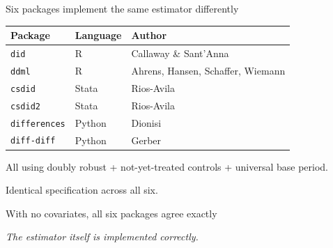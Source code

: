 \documentclass[aspectratio=169,11pt]{beamer}
\begin{document}
\begin{frame}{Six packages implement the same estimator differently}

\begin{center}
\small
\begin{tabular}{@{}lll@{}}
\toprule
Package & Language & Author \\
\midrule
\texttt{did} & R & Callaway \& Sant'Anna \\
\texttt{ddml} & R & Ahrens, Hansen, Schaffer, Wiemann \\
\texttt{csdid} & Stata & Rios-Avila \\
\texttt{csdid2} & Stata & Rios-Avila \\
\texttt{differences} & Python & Dionisi \\
\texttt{diff-diff} & Python & Gerber \\
\bottomrule
\end{tabular}
\end{center}

\vspace{0.5cm}

All using doubly robust + not-yet-treated controls + universal base period.

\vspace{0.35cm}

\alert{Identical specification across all six.}

\end{frame}

\begin{frame}{With no covariates, all six packages agree exactly}

\vspace{0.3cm}
\begin{center}
\end{center}

\vspace{0.4cm}

\begin{center}
\textit{The estimator itself is implemented correctly.}
\end{center}
\end{frame}
\end{document}
